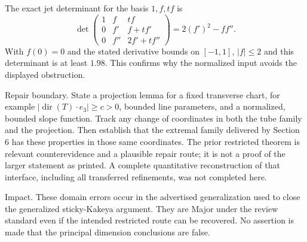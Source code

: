 \documentclass[10pt]{article}
\begin{document}
The exact jet determinant for the basis \(1,f,tf\) is \[\det\begin{pmatrix}
 1&f&tf\\0&f'&f+tf'\\0&f''&2f'+tf''
 \end{pmatrix}=2(f')^2-ff''.\] With \(f(0)=0\) and the stated derivative bounds on \([-1,1]\), \(|f|\leq2\) and this determinant is at least \(1.98\). This confirms why the normalized input avoids the displayed obstruction.\par
Repair boundary. State a projection lemma for a fixed transverse chart, for example \(|\operatorname{dir}(T)\cdot e_3|\geq c>0\), bounded line parameters, and a normalized, bounded slope function. Track any change of coordinates in both the tube family and the projection. Then establish that the extremal family delivered by Section 6 has these properties in those same coordinates. The prior restricted theorem is relevant counterevidence and a plausible repair route; it is not a proof of the larger statement as printed. A complete quantitative reconstruction of that interface, including all transferred refinements, was not completed here.\par
Impact. These domain errors occur in the advertised generalization used to close the generalized sticky-Kakeya argument. They are Major under the review standard even if the intended restricted route can be recovered. No assertion is made that the principal dimension conclusions are false.\par
\end{document}
